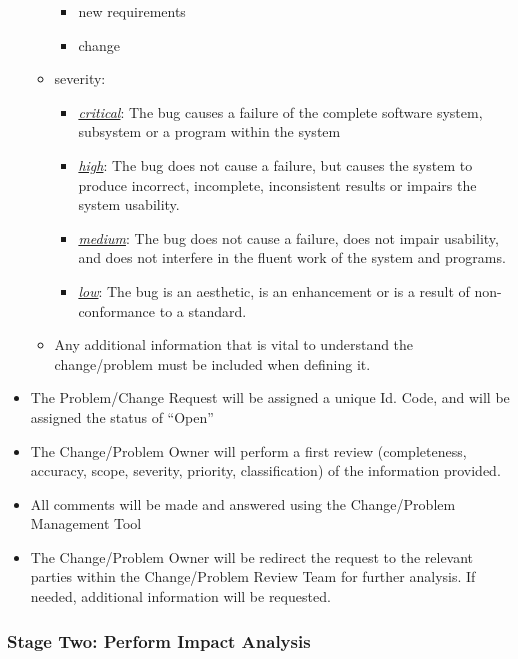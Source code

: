 \documentclass{template/openetcs_article}
\begin{document}
\begin{itemize}
\begin{itemize}
\begin{itemize}
\item new requirements
\item change
\end{itemize}
\item severity: 
\begin{itemize}
\item \underline{\it critical}: The bug causes a failure of the complete software system, subsystem or a program within the system
\item \underline{\it high}: The bug does not cause a failure, but causes the system to produce incorrect, incomplete, inconsistent results or impairs the system usability. 
\item \underline{\it medium}: The bug does not cause a failure, does not impair usability, and does not interfere in the fluent work of the system and programs. 
\item \underline{\it low}: The bug is an aesthetic, is an enhancement or is a result of non-conformance to a standard.
\end{itemize}
\item Any additional information that is vital to understand the change/problem must be included when defining it.
\end{itemize}
\item The Problem/Change Request will be assigned a unique Id. Code, and will be assigned the status of “Open”
\item The Change/Problem Owner will perform a first review (completeness, accuracy, scope, severity, priority, classification) of the information provided.
\item All comments will be made and answered using the Change/Problem Management Tool 
\item The Change/Problem Owner will be redirect the request to the relevant parties within the Change/Problem Review Team for further analysis. If needed, additional information will be requested.
\end{itemize}

\subsubsection{Stage Two: Perform Impact Analysis}
\end{document}
